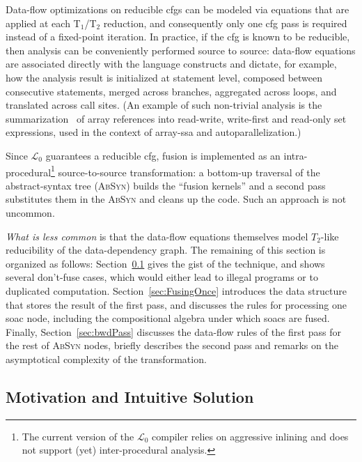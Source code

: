 \documentclass{sigplanconf}  %
\newcommand{\LO}{$\mathcal{L}_0$}
\begin{document}
Data-flow optimizations on reducible {\sc cfg}s can be modeled via equations 
that are applied at each T$_1$/T$_2$ reduction, and consequently only one
{\sc cfg} pass is required instead of a fixed-point iteration.
%
In practice, if the {\sc cfg} is known to be reducible, then 
analysis can be conveniently performed source to source: 
data-flow equations are associated directly with the
language constructs and dictate, for example, how the analysis result is
initialized at statement level, composed between consecutive statements,
merged across branches, aggregated across loops, and translated across 
call sites.  (An example of such non-trivial 
analysis is the summarization~\cite{HybAn} of array references into 
read-write, write-first and read-only set expressions, used in the context 
of array-{\sc ssa} and autoparallelization.)
 
Since \LO{} guarantees a reducible {\sc cfg}, %
fusion is implemented as an intra-procedural\footnote{
The current version of the \LO{} compiler 
relies on aggressive inlining and does not support
(yet) inter-procedural analysis.
}
source-to-source transformation: a bottom-up traversal of the 
abstract-syntax tree (\textsc{AbSyn}) builds the ``fusion kernels'' 
and a second pass substitutes them in the \textsc{AbSyn} and 
cleans up the code.    Such an approach is not uncommon. 

{\em What is less common} is that the data-flow equations 
themselves model $T_2$-like reducibility of the data-dependency graph.
The remaining of this section is organized as follows:
Section~\ref{sec:Intuition} gives the gist of the technique,
and shows several don't-fuse cases, which would
either lead to illegal programs or to duplicated computation.
%
Section~\ref{sec:FusingOnce} introduces the data structure
that stores the result of the first pass, and discusses the rules 
for processing one {\sc soac} node, including the compositional
algebra under which {\sc soac}s are fused. 
Finally, Section~\ref{sec:bwdPass} discusses the data-flow rules of
the first pass for the rest of \textsc{AbSyn} nodes, briefly 
describes the second pass and remarks on the asymptotical 
complexity of the transformation.

\subsection{Motivation and Intuitive Solution}
\label{sec:Intuition}
\end{document}
